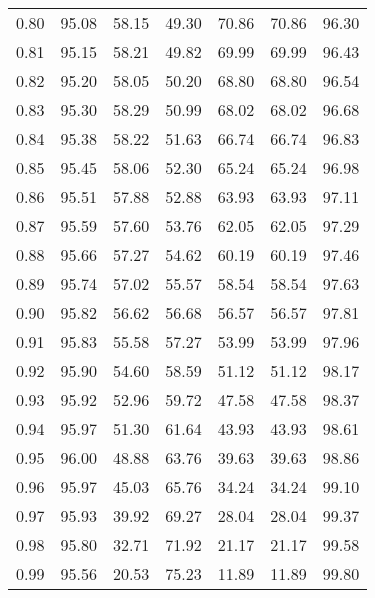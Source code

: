 \begin{tabular}{|c|c|c|c|c|c|c|}
      0.80 &     95.08 &     58.15 &      49.30 &   70.86 &      70.86 &         96.30 \\
      0.81 &     95.15 &     58.21 &      49.82 &   69.99 &      69.99 &         96.43 \\
      0.82 &     95.20 &     58.05 &      50.20 &   68.80 &      68.80 &         96.54 \\
      0.83 &     95.30 &     58.29 &      50.99 &   68.02 &      68.02 &         96.68 \\
      0.84 &     95.38 &     58.22 &      51.63 &   66.74 &      66.74 &         96.83 \\
      0.85 &     95.45 &     58.06 &      52.30 &   65.24 &      65.24 &         96.98 \\
      0.86 &     95.51 &     57.88 &      52.88 &   63.93 &      63.93 &         97.11 \\
      0.87 &     95.59 &     57.60 &      53.76 &   62.05 &      62.05 &         97.29 \\
      0.88 &     95.66 &     57.27 &      54.62 &   60.19 &      60.19 &         97.46 \\
      0.89 &     95.74 &     57.02 &      55.57 &   58.54 &      58.54 &         97.63 \\
      0.90 &     95.82 &     56.62 &      56.68 &   56.57 &      56.57 &         97.81 \\
      0.91 &     95.83 &     55.58 &      57.27 &   53.99 &      53.99 &         97.96 \\
      0.92 &     95.90 &     54.60 &      58.59 &   51.12 &      51.12 &         98.17 \\
      0.93 &     95.92 &     52.96 &      59.72 &   47.58 &      47.58 &         98.37 \\
      0.94 &     95.97 &     51.30 &      61.64 &   43.93 &      43.93 &         98.61 \\
      0.95 &     96.00 &     48.88 &      63.76 &   39.63 &      39.63 &         98.86 \\
      0.96 &     95.97 &     45.03 &      65.76 &   34.24 &      34.24 &         99.10 \\
      0.97 &     95.93 &     39.92 &      69.27 &   28.04 &      28.04 &         99.37 \\
      0.98 &     95.80 &     32.71 &      71.92 &   21.17 &      21.17 &         99.58 \\
      0.99 &     95.56 &     20.53 &      75.23 &   11.89 &      11.89 &         99.80 \\
\bottomrule
\end{tabular}
